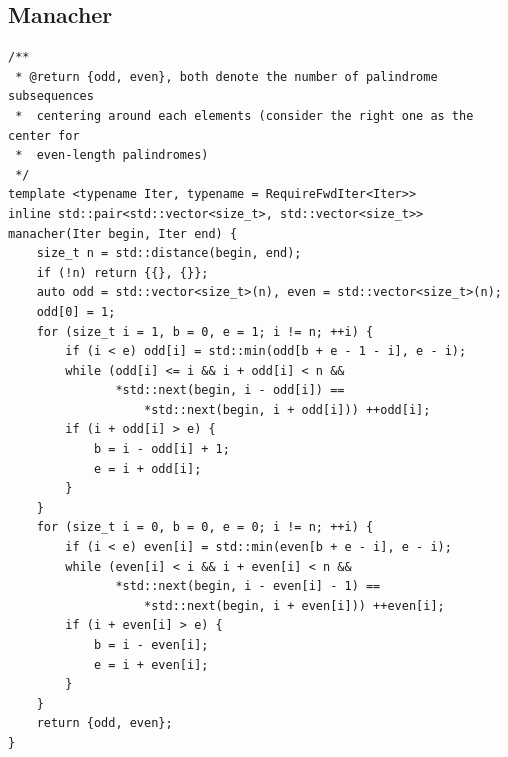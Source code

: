 \documentclass[UTF8]{article}
\begin{document}
\subsection{Manacher}
\begin{verbatim}
/**
 * @return {odd, even}, both denote the number of palindrome subsequences
 * 	centering around each elements (consider the right one as the center for
 * 	even-length palindromes)
 */
template <typename Iter, typename = RequireFwdIter<Iter>>
inline std::pair<std::vector<size_t>, std::vector<size_t>>
manacher(Iter begin, Iter end) {
	size_t n = std::distance(begin, end);
	if (!n) return {{}, {}};
	auto odd = std::vector<size_t>(n), even = std::vector<size_t>(n);
	odd[0] = 1;
	for (size_t i = 1, b = 0, e = 1; i != n; ++i) {
		if (i < e) odd[i] = std::min(odd[b + e - 1 - i], e - i);
		while (odd[i] <= i && i + odd[i] < n &&
			   *std::next(begin, i - odd[i]) ==
				   *std::next(begin, i + odd[i])) ++odd[i];
		if (i + odd[i] > e) {
			b = i - odd[i] + 1;
			e = i + odd[i];
		}
	}
	for (size_t i = 0, b = 0, e = 0; i != n; ++i) {
		if (i < e) even[i] = std::min(even[b + e - i], e - i);
		while (even[i] < i && i + even[i] < n &&
			   *std::next(begin, i - even[i] - 1) ==
				   *std::next(begin, i + even[i])) ++even[i];
		if (i + even[i] > e) {
			b = i - even[i];
			e = i + even[i];
		}
	}
	return {odd, even};
}
\end{verbatim}
\end{document}
